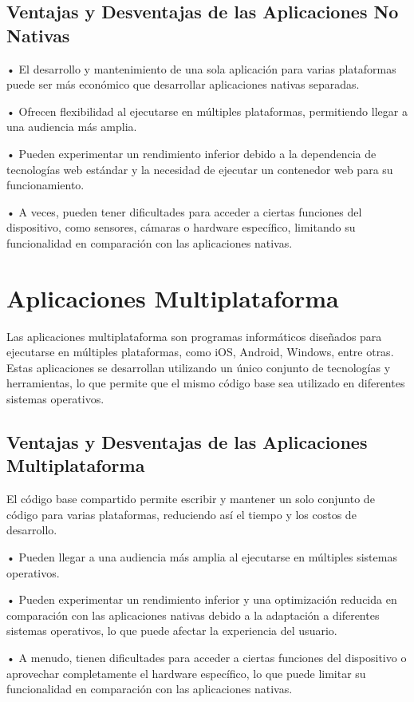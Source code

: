 \documentclass{article}
\begin{document}
\begin{multicols}{2}
		\subsection{Ventajas y Desventajas de las Aplicaciones No Nativas}
		
		
		• El desarrollo y mantenimiento de una sola aplicación para varias plataformas puede ser más económico que desarrollar aplicaciones nativas separadas.
		
		• Ofrecen flexibilidad al ejecutarse en múltiples plataformas, permitiendo llegar a una audiencia más amplia.
		
		• Pueden experimentar un rendimiento inferior debido a la dependencia de tecnologías web estándar y la necesidad de ejecutar un contenedor web para su funcionamiento.
    	
    	• A veces, pueden tener dificultades para acceder a ciertas funciones del dispositivo, como sensores, cámaras o hardware específico, limitando su funcionalidad en comparación con las aplicaciones nativas.

		\section{Aplicaciones Multiplataforma}
		Las aplicaciones multiplataforma son programas informáticos diseñados para ejecutarse en múltiples plataformas, como iOS, Android, Windows, entre otras. Estas aplicaciones se desarrollan utilizando un único conjunto de tecnologías y herramientas, lo que permite que el mismo código base sea utilizado en diferentes sistemas operativos.
	
		\subsection{Ventajas y Desventajas de las Aplicaciones Multiplataforma}
		El código base compartido permite escribir y mantener un solo conjunto de código para varias plataformas, reduciendo así el tiempo y los costos de desarrollo.
		
		• Pueden llegar a una audiencia más amplia al ejecutarse en múltiples sistemas operativos.
		
		• Pueden experimentar un rendimiento inferior y una optimización reducida en comparación con las aplicaciones nativas debido a la adaptación a diferentes sistemas operativos, lo que puede afectar la experiencia del usuario.
		
		• A menudo, tienen dificultades para acceder a ciertas funciones del dispositivo o aprovechar completamente el hardware específico, lo que puede limitar su funcionalidad en comparación con las aplicaciones nativas.
		
	\end{multicols} 
	
\end{document}
